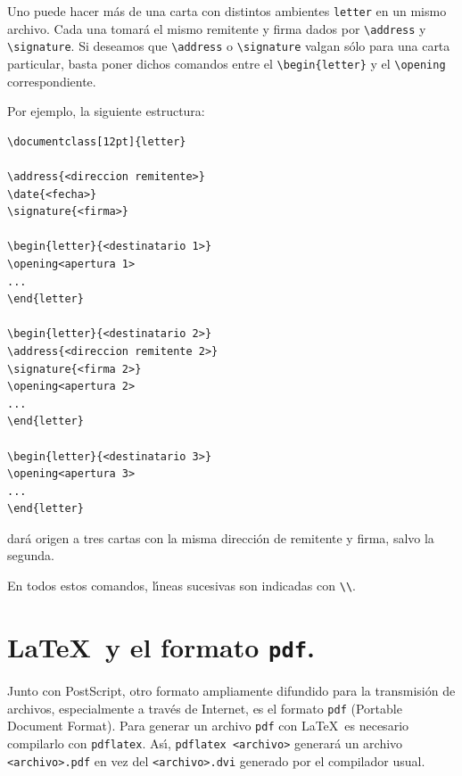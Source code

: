 {Uno puede hacer m{\'a}s de una carta con distintos
ambientes \verb+letter+ en un mismo archivo. Cada una tomar{\'a} el
mismo remitente y firma dados por \verb+\address+ y
\verb+\signature+. Si deseamos que \verb+\address+ o
\verb+\signature+ valgan s{\'o}lo para una carta particular, basta
poner dichos comandos entre el \verb+\begin{letter}+ y el
\verb+\opening+ correspondiente.

Por ejemplo, la siguiente estructura:

\begin{verbatim}
\documentclass[12pt]{letter}

\address{<direccion remitente>}
\date{<fecha>}
\signature{<firma>}

\begin{letter}{<destinatario 1>}
\opening<apertura 1>
...
\end{letter}

\begin{letter}{<destinatario 2>}
\address{<direccion remitente 2>}
\signature{<firma 2>}
\opening<apertura 2>
...
\end{letter}

\begin{letter}{<destinatario 3>}
\opening<apertura 3>
...
\end{letter}

\end{verbatim}
dar\'a origen a tres cartas con la misma direcci\'on de remitente y
firma, salvo la segunda. 

En todos estos comandos, l{\'\i}neas sucesivas son indicadas con
\verb+\\+. 




\section{\LaTeX\ y el formato {\tt pdf}.}

Junto con PostScript, otro formato ampliamente difundido
para la transmisi\'on de archivos, especialmente a trav\'es de
Internet, es el formato \verb+pdf+ (Portable Document Format). Para
generar un archivo \verb+pdf+ con \LaTeX\ es necesario compilarlo con
\verb+pdflatex+. As\'{\i}, \verb+pdflatex <archivo>+ generar\'a un
archivo \verb+<archivo>.pdf+ en vez del \verb+<archivo>.dvi+ generado
por el compilador usual. 

}
